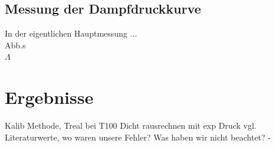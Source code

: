 \documentclass[]{article}
\begin{document}
\subsection{Messung der Dampfdruckkurve}
In der eigentlichen Hauptmessung ...\\
Abb.s\\
$\Lambda$\\ 
\section{Ergebnisse}
Kalib Methode, Treal bei T100
Dicht rausrechnen mit exp
Druck
vgl. Literaturwerte, wo waren unsere Fehler? Was haben wir nicht beachtet? - 
\end{document}
